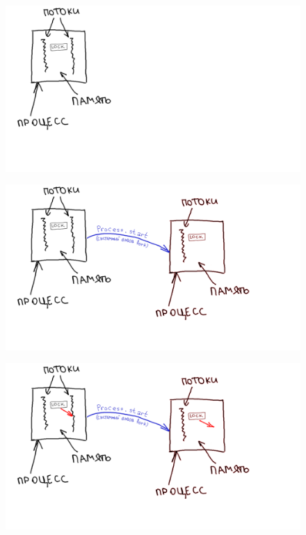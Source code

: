 \documentclass[10pt,pdf,utf8,aspectratio=169,xcolor=dvipsnames,x11names,center]{beamer}
\begin{document}

\begin{frame}
  \begin{figure}
    \includegraphics[scale=0.8]{diagrams/single_process}
  \end{figure}
\end{frame}

\begin{frame}
  \begin{figure}
    \includegraphics[scale=0.8]{diagrams/fork}
  \end{figure}
\end{frame}

\begin{frame}
  \begin{figure}
    \includegraphics[scale=0.8]{diagrams/locked}
  \end{figure}
\end{frame}
\end{document}
